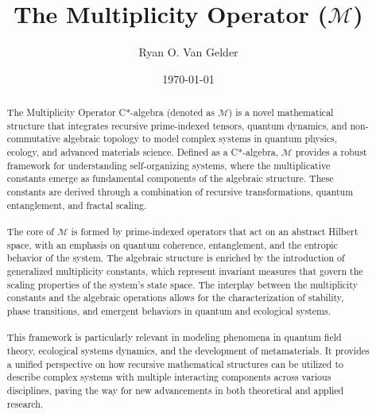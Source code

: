 \documentclass{article}
\theoremstyle{plain}
\begin{document}
\title{The Multiplicity Operator (\( \mathcal{M} \))}

\author{Ryan O. Van Gelder}
\date{\today}

\maketitle
\nolinenumbers

\begin{abstract}
The Multiplicity Operator C*-algebra (denoted as \( \mathcal{M} \)) is a novel mathematical structure that integrates recursive prime-indexed tensors, quantum dynamics, and non-commutative algebraic topology to model complex systems in quantum physics, ecology, and advanced materials science. Defined as a C*-algebra, \( \mathcal{M} \) provides a robust framework for understanding self-organizing systems, where the multiplicative constants emerge as fundamental components of the algebraic structure. These constants are derived through a combination of recursive transformations, quantum entanglement, and fractal scaling.

\paragraph{}The core of \( \mathcal{M} \) is formed by prime-indexed operators that act on an abstract Hilbert space, with an emphasis on quantum coherence, entanglement, and the entropic behavior of the system. The algebraic structure is enriched by the introduction of generalized multiplicity constants, which represent invariant measures that govern the scaling properties of the system's state space. The interplay between the multiplicity constants and the algebraic operations allows for the characterization of stability, phase transitions, and emergent behaviors in quantum and ecological systems.

\paragraph{}This framework is particularly relevant in modeling phenomena in quantum field theory, ecological systems dynamics, and the development of metamaterials. It provides a unified perspective on how recursive mathematical structures can be utilized to describe complex systems with multiple interacting components across various disciplines, paving the way for new advancements in both theoretical and applied research.
\end{abstract}
\end{document}
